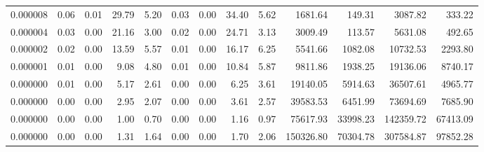 \begin{tabular}{lrrrrrrrrrrrr}
0.000008 & 0.06 & 0.01 & 29.79 & 5.20 & 0.03 & 0.00 & 34.40 & 5.62 & 1681.64 & 149.31 & 3087.82 & 333.22 \\
0.000004 & 0.03 & 0.00 & 21.16 & 3.00 & 0.02 & 0.00 & 24.71 & 3.13 & 3009.49 & 113.57 & 5631.08 & 492.65 \\
0.000002 & 0.02 & 0.00 & 13.59 & 5.57 & 0.01 & 0.00 & 16.17 & 6.25 & 5541.66 & 1082.08 & 10732.53 & 2293.80 \\
0.000001 & 0.01 & 0.00 & 9.08 & 4.80 & 0.01 & 0.00 & 10.84 & 5.87 & 9811.86 & 1938.25 & 19136.06 & 8740.17 \\
0.000000 & 0.01 & 0.00 & 5.17 & 2.61 & 0.00 & 0.00 & 6.25 & 3.61 & 19140.05 & 5914.63 & 36507.61 & 4965.77 \\
0.000000 & 0.00 & 0.00 & 2.95 & 2.07 & 0.00 & 0.00 & 3.61 & 2.57 & 39583.53 & 6451.99 & 73694.69 & 7685.90 \\
0.000000 & 0.00 & 0.00 & 1.00 & 0.70 & 0.00 & 0.00 & 1.16 & 0.97 & 75617.93 & 33998.23 & 142359.72 & 67413.09 \\
0.000000 & 0.00 & 0.00 & 1.31 & 1.64 & 0.00 & 0.00 & 1.70 & 2.06 & 150326.80 & 70304.78 & 307584.87 & 97852.28 \\
\bottomrule
\end{tabular}
